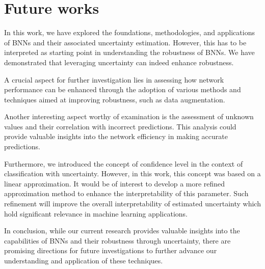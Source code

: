 \section{Future works}

In this work, we have explored the foundations, methodologies, and applications of BNNs and their associated uncertainty estimation. However, this has to be interpreted as starting point in understanding the robustness of BNNs. We have demonstrated that leveraging uncertainty can indeed enhance robustness.

A crucial aspect for further investigation lies in assessing how network performance can be enhanced through the adoption of various methods and techniques aimed at improving robustness, such as data augmentation.

Another interesting aspect worthy of examination is the assessment of unknown values and their correlation with incorrect predictions. This analysis could provide valuable insights into the network efficiency in making accurate predictions.

Furthermore, we introduced the concept of confidence level in the context of classification with uncertainty. However, in this work, this concept was based on a linear approximation. It would be of interest to develop a more refined approximation method to enhance the interpretability of this parameter. Such refinement will improve the overall interpretability of estimated uncertainty which hold significant relevance in machine learning applications.

In conclusion, while our current research provides valuable insights into the capabilities of BNNs and their robustness through uncertainty, there are promising directions for future investigations to further advance our understanding and application of these techniques.